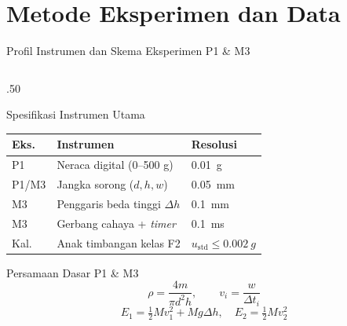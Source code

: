 \documentclass[aspectratio=169,10pt]{beamer}
\newcommand{\sm}{\fontsize{8.2}{10.2}\selectfont}
\newcommand{\xs}{\fontsize{7.1}{9}\selectfont}
\begin{document}
\section{Metode Eksperimen dan Data}

\begin{frame}{Profil Instrumen dan Skema Eksperimen P1 \& M3}
\begin{columns}[T,onlytextwidth]
\begin{column}{.50\textwidth}
\begin{block}{Spesifikasi Instrumen Utama}\xs
\begin{tabular}{@{}lll@{}}
\toprule
\textbf{Eks.} & \textbf{Instrumen} & \textbf{Resolusi}\\
\midrule
P1 & Neraca digital (0--500 g) & \SI{0,01}{g}\\
P1/M3 & Jangka sorong ($d, h, w$) & \SI{0,05}{mm}\\
M3 & Penggaris beda tinggi $\Delta h$ & \SI{0,1}{mm}\\
M3 & Gerbang cahaya + \textit{timer} & \SI{0,1}{ms}\\
Kal. & Anak timbangan kelas F2 & $u_{\mathrm{std}} \le \SI{0,002}{g}$\\
\bottomrule
\end{tabular}
\end{block}
\begin{exampleblock}{Persamaan Dasar P1 \& M3}\sm
$$\rho = \frac{4m}{\pi d^2 h}, \qquad v_i = \frac{w}{\Delta t_i}$$
$$E_1 = \tfrac{1}{2}Mv_1^2 + Mg\Delta h, \quad E_2 = \tfrac{1}{2}Mv_2^2$$
\end{exampleblock}
\end{column}


\end{columns}
\end{frame}
\end{document}
